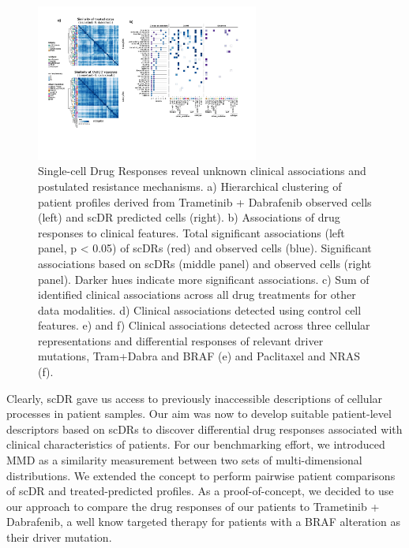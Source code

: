 \begin{figure}[h]
  \begin{center}
    \includegraphics[width=0.65\textwidth]{figures/cellot-cohort/iid-associations.pdf}
  \end{center}
  \caption{
  Single-cell Drug Responses reveal unknown clinical associations and postulated resistance mechanisms.
a) Hierarchical clustering of patient profiles derived from Trametinib + Dabrafenib observed cells (left) and scDR predicted cells (right).
b) Associations of drug responses to clinical features. Total significant associations (left panel, p < 0.05) of scDRs (red) and observed cells (blue). Significant associations based on scDRs (middle panel) and observed cells (right panel). Darker hues indicate more significant associations.
c) Sum of identified clinical associations across all drug treatments for other data modalities.
d) Clinical associations detected using control cell features.
e) and f) Clinical associations detected across three cellular representations and differential responses of relevant driver mutations, Tram+Dabra and BRAF (e) and Paclitaxel and NRAS (f).
}
  \label{fig:iid-associations}
\end{figure}

Clearly, scDR gave us access to previously inaccessible descriptions of cellular processes in patient samples.
 Our aim was now to develop suitable patient-level descriptors based on scDRs to discover differential drug responses associated with clinical characteristics of patients.
 For our benchmarking effort, we introduced MMD as a similarity measurement between two sets of multi-dimensional distributions.
 We extended the concept to perform pairwise patient comparisons of scDR and treated-predicted profiles.
 As a proof-of-concept, we decided to use our approach to compare the drug responses of our patients to Trametinib + Dabrafenib, a well know targeted therapy for patients with a BRAF alteration as their driver mutation.
 

